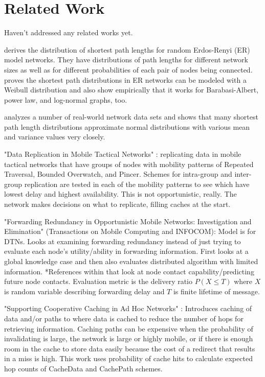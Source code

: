 
\section{Related Work}
\label{sec:related_work}

Haven't addressed any related works yet.

\cite{analytical_DSPLs_rand_nets} derives the distribution of shortest path lengths for random Erdos-Renyi (ER) model networks.  They have distributions of path lengths for different network sizes as well as for different probabilities of each pair of nodes being connected.  \cite{weibull_model_SPD_rand_nets} proves the shortest path distributions in ER networks can be modeled with a Weibull distribution and also show empirically that it works for Barabasi-Albert, power law, and log-normal graphs, too. 

\cite{distance_dist_realworld_nets} analyzes a number of real-world network data sets and shows that many shortest path length distributions approximate normal distributions with various mean and variance values very closely.  

"Data Replication in Mobile Tactical Networks" \cite{data_rep_tact_nets}:  replicating data in mobile tactical networks that have groups of nodes with mobility patterns of Repeated Traversal, Bounded Overwatch, and Pincer.  Schemes for intra-group and inter-group replication are tested in each of the mobility patterns to see which have lowest delay and highest availability.  This is not opportunistic, really.  The network makes decisions on what to replicate, filling caches at the start.

"Forwarding Redundancy in Opportunistic Mobile Networks: Investigation and Elimination" \cite{forw_red_gao2014} (Transactions on Mobile Computing and INFOCOM): Model is for DTNs.  Looks at examining forwarding redundancy instead of just trying to evaluate each node's utility/ability in forwarding information.  First looks at a global knowledge case and then also evaluates distributed algorithm with limited information.  *References within that look at node contact capability/predicting future node contacts.  Evaluation metric is the delivery ratio $P(X \leq T)$ where $X$ is random variable describing forwarding delay and $T$ is finite lifetime of message.

"Supporting Cooperative Caching in Ad Hoc Networks" \cite{coop_cache_TOMC2006}:  Introduces caching of data and/or paths to where data is cached to reduce the number of hops for retrieving information.  Caching paths can be expensive when the probability of invalidating is large, the network is large or highly mobile, or if there is enough room in the cache to store data easily because the cost of a redirect that results in a miss is high.  This work uses probability of cache hits to calculate expected hop counts of CacheData and CachePath schemes.

